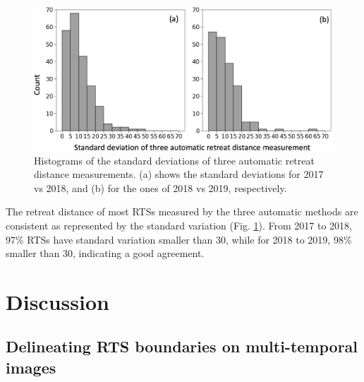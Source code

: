 \documentclass[authoryear,preprint,review,12pt]{elsarticle}
\begin{document}
\begin{figure} 
	\centering
	\includegraphics[width=14cm]{figs/standard_deviation_trim.jpg}
	\caption{Histograms of the standard deviations of three automatic retreat distance measurements. (a) shows the standard deviations for 2017 vs 2018, and (b) for the ones of 2018 vs 2019, respectively.}
	\label{fig_re_dis_standard_var}
\end{figure}

The retreat distance of most RTSs measured by the three automatic methods are consistent as represented by the standard variation (Fig. \ref{fig_re_dis_standard_var}).
From 2017 to 2018, 97\% RTSs have standard variation smaller than 30, while for 2018 to 2019, 98\% smaller than 30, indicating a good agreement. 

 

 

\section{Discussion}
\label{sec_discussion}

\subsection{Delineating RTS boundaries on multi-temporal images}
\label{sec_diss_mapping_rts_multi_images}
\end{document}
